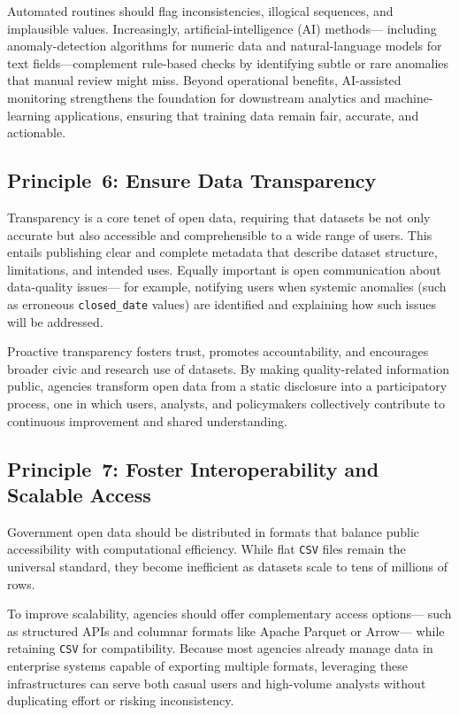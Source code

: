 \documentclass[linenumber]{jdsart}
\begin{document}
Automated routines should flag inconsistencies, illogical sequences, and 
implausible values.  Increasingly, artificial-intelligence (AI) methods—%
including anomaly-detection algorithms for numeric data and natural-language 
models for text fields—complement rule-based checks by identifying subtle or 
rare anomalies that manual review might miss.  
Beyond operational benefits, AI-assisted monitoring strengthens the 
foundation for downstream analytics and machine-learning applications, 
ensuring that training data remain fair, accurate, and actionable.


\subsection{Principle~6: Ensure Data Transparency}
\label{subsec:principle6}
Transparency is a core tenet of open data, requiring that datasets be 
not only accurate but also accessible and comprehensible to a wide 
range of users. This entails publishing clear and complete metadata 
that describe dataset structure, limitations, and intended uses.  
Equally important is open communication about data-quality issues—%
for example, notifying users when systemic anomalies (such as erroneous 
\texttt{closed\_date} values) are identified and explaining how such 
issues will be addressed.  

Proactive transparency fosters trust, promotes accountability, and 
encourages broader civic and research use of datasets.  
By making quality-related information public, agencies transform open 
data from a static disclosure into a participatory process, one in 
which users, analysts, and policymakers collectively contribute to 
continuous improvement and shared understanding.

\subsection{Principle~7: Foster Interoperability and Scalable Access}
\label{subsec:principle7}
Government open data should be distributed in formats that balance public 
accessibility with computational efficiency.  
While flat \texttt{CSV} files remain the universal standard, they become 
inefficient as datasets scale to tens of millions of rows.  

To improve scalability, agencies should offer complementary access options—%
such as structured APIs and columnar formats like Apache Parquet or Arrow—%
while retaining \texttt{CSV} for compatibility.  
Because most agencies already manage data in enterprise systems capable of 
exporting multiple formats, leveraging these infrastructures can serve both 
casual users and high-volume analysts without duplicating effort or risking 
inconsistency.  
\end{document}
